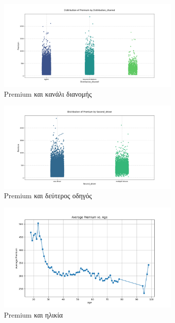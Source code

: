 \documentclass{llncs}
\begin{document}
\begin{figure}
    \begin{center}
        \includegraphics[width=0.8\textwidth]{images/distributionAll.png}
    \end{center}
    \caption{Premium και κανάλι διανομής} 
    \label{fig:premium_distribution_channel}   
\end{figure}

\begin{figure}
    \begin{center}
        \includegraphics[width=0.8\textwidth]{images/Second_driver_ALL.png}
    \end{center}
    \caption{Premium και δεύτερος οδηγός} 
    \label{fig:premium_second_driver}   
\end{figure}

\begin{figure}
    \begin{center}
        \includegraphics[width=0.8\textwidth]{images/ageVSpremium.png}
    \end{center}
    \caption{Premium και ηλικία} 
    \label{fig:ageVSpremium}   
\end{figure}
\end{document}
